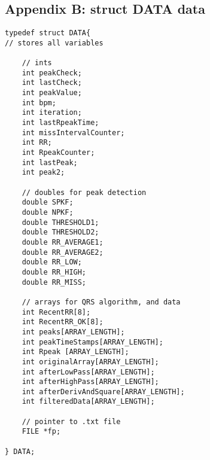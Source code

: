 \subsection{Appendix B: struct DATA data}
\label{Apx:B}
\begin{multicols}{2}

\begin{lstlisting}
typedef struct DATA{
// stores all variables
    
    // ints
    int peakCheck;
    int lastCheck;
    int peakValue;
    int bpm;
    int iteration;
    int lastRpeakTime;
    int missIntervalCounter;
    int RR;
    int RpeakCounter;
    int lastPeak;
    int peak2;
    
    // doubles for peak detection
    double SPKF;
    double NPKF;
    double THRESHOLD1;
    double THRESHOLD2;
    double RR_AVERAGE1;
    double RR_AVERAGE2;
    double RR_LOW;
    double RR_HIGH;
    double RR_MISS;

    // arrays for QRS algorithm, and data
    int RecentRR[8];
    int RecentRR_OK[8];
    int peaks[ARRAY_LENGTH];
    int peakTimeStamps[ARRAY_LENGTH];
    int Rpeak [ARRAY_LENGTH];
    int originalArray[ARRAY_LENGTH];
    int afterLowPass[ARRAY_LENGTH];
    int afterHighPass[ARRAY_LENGTH];
    int afterDerivAndSquare[ARRAY_LENGTH];
    int filteredData[ARRAY_LENGTH];
    
    // pointer to .txt file
    FILE *fp;
    
} DATA;
\end{lstlisting}

\end{multicols}